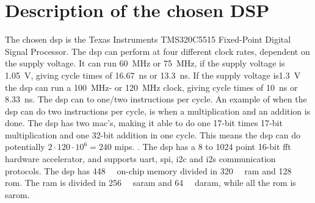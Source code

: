 \section{Description of the chosen DSP}


The chosen \gls{dsp} is the Texas Instruments TMS320C5515 Fixed-Point Digital Signal Processor.
The \gls{dsp} can perform at four different clock rates, dependent on the supply voltage. It can run \SI{60}{\mega\hertz} or \SI{75}{\mega\hertz}, if the supply voltage is \SI{1.05}{\volt}, giving cycle times of \SI{16.67}{\nano\second} or \SI{13.3}{\nano\second}. If the supply voltage is\SI{1.3}{\volt} the \gls{dsp} can run a \SI{100}{\mega\hertz}- or \SI{120}{\mega\hertz} clock, giving cycle times of \SI{10}{\nano\second} or \SI{8.33}{\nano\second}. The \gls{dsp} can to one/two instructions per cycle. An example of when the \gls{dsp} can do two instructions per cycle, is when a multiplication and an addition is done. The \gls{dsp} has two \gls{mac}'s, making it able to do one 17-bit times 17-bit multiplication and one 32-bit addition in one cycle. This means the \gls{dsp} can do potentially $2 \cdot 120 \cdot 10^6 = 240$ \gls{mips}. . The \gls{dsp} has a 8 to 1024 point 16-bit \gls{fft} hardware accelerator, and supports \gls{uart}, \gls{spi}, \gls{i2c} and \gls{i2s} communication protocols.
The \gls{dsp} has \SI{448}{\kilo\byte} on-chip memory divided in \SI{320}{\kilo\byte} \gls{ram} and \SI{128}{\kilo\byte} \gls{rom}. The \gls{ram} is divided in \SI{256}{\kilo\byte} \gls{saram} and \SI{64}{\kilo\byte} \gls{daram}, while all the \gls{rom} is \gls{sarom}.
%
%
%
%
%
%
